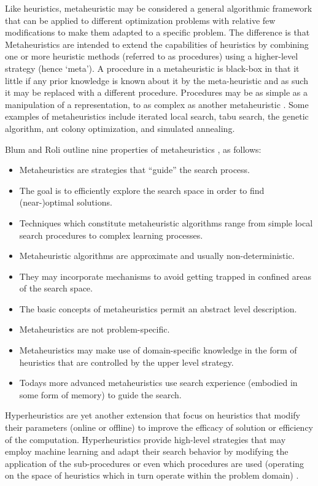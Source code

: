 \documentclass[a4paper, 11pt]{article}
\begin{document}
Like heuristics, metaheuristic may be considered a general algorithmic framework that can be applied to different optimization problems with relative few modifications to make them adapted to a specific problem. The difference is that Metaheuristics are intended to extend the capabilities of heuristics by combining one or more heuristic methods (referred to as procedures) using a higher-level strategy (hence `meta'). A procedure in a metaheuristic is black-box in that it little if any prior knowledge is known about it by the meta-heuristic and as such it may be replaced with a different procedure. Procedures may be as simple as a manipulation of a representation, to as complex as another metaheuristic \cite{Glover2003, Talbi2009}. Some examples of metaheuristics include iterated local search, tabu search, the genetic algorithm, ant colony optimization, and simulated annealing.

Blum and Roli outline nine properties of metaheuristics \cite{Blum2003}, as follows: 
\begin{itemize}
	\item Metaheuristics are strategies that ``guide'' the search process.
	\item The goal is to efficiently explore the search space in order to find (near-)optimal solutions.
	\item Techniques which constitute metaheuristic algorithms range from simple local search procedures to complex learning processes.
	\item Metaheuristic algorithms are approximate and usually non-deterministic.
	\item They may incorporate mechanisms to avoid getting trapped in confined areas of the search space.
	\item The basic concepts of metaheuristics permit an abstract level description.
	\item Metaheuristics are not problem-specific.
	\item Metaheuristics may make use of domain-specific knowledge in the form of heuristics that are controlled by the upper level strategy.
	\item Todays more advanced metaheuristics use search experience (embodied in some form of memory) to guide the search.
\end{itemize}

Hyperheuristics are yet another extension that focus on heuristics that modify their parameters (online or offline) to improve the efficacy of solution or efficiency of the computation. Hyperheuristics provide high-level strategies that may employ machine learning and adapt their search behavior by modifying the application of the sub-procedures or even which procedures are used (operating on the space of heuristics which in turn operate within the problem domain) \cite{Burke2003a, Burke2003}. 
\end{document}
